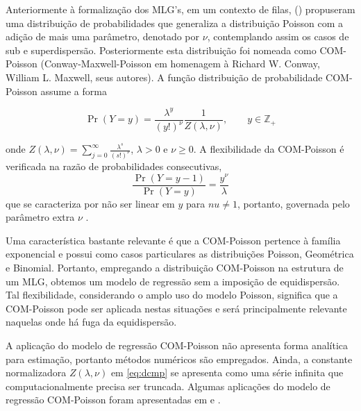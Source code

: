 \documentclass[
12pt,				%
openright,			%
oneside,			%
a4paper,			%
english,			%
brazil,				%
]{abntex2}
\begin{document}
Anteriormente à formalização dos MLG's, em um contexto de filas,
 (\citeyear{Conway1962}) propuseram uma
distribuição de probabilidades que 
generaliza a distribuição Poisson com a adição de mais uma parâmetro,
denotado por $\nu$, contemplando assim os casos de sub e
superdispersão. Posteriormente esta distribuição foi nomeada como 
COM-Poisson (Conway-Maxwell-Poisson em homenagem à Richard W. Conway,
William L. Maxwell, seus autores). A função distribuição de
probabilidade COM-Poisson assume a forma

\begin{equation} \label{eq:dcmp}
  \Pr(Y = y) = \frac{\lambda^y}{(y!)^\nu} \frac{1}{Z(\lambda, \nu)},
  \qquad y \in \mathbb{Z}_+
\end{equation}

\noindent
onde $Z(\lambda, \nu) = \sum_{j=0}^\infty \frac{\lambda^s}{(s!)^\nu}$,
$\lambda > 0$ e $\nu \geq 0$. A flexibilidade da COM-Poisson é
verificada na razão de probabilidades consecutivas,
\begin{equation}
\frac{\Pr(Y = y - 1)}{\Pr(Y = y)} = \frac{y^\nu}{\lambda}
\end{equation}
que se caracteriza por
não ser linear em $y$ para $nu \neq 1$, portanto, governada pelo
parâmetro extra $\nu$ 
\cite{Shmueli2005}.

Uma característica bastante relevante é que a COM-Poisson
pertence à família exponencial e possui como casos particulares as
distribuições Poisson, Geométrica e Binomial. Portanto, empregando a
distribuição COM-Poisson na estrutura de um MLG, obtemos um modelo de
regressão sem a imposição de equidispersão. Tal flexibilidade,
considerando o amplo uso do modelo Poisson, significa que a COM-Poisson
pode ser aplicada nestas situações e será principalmente relevante
naquelas onde há fuga da equidispersão.

A aplicação do modelo de regressão COM-Poisson não apresenta forma
analítica para estimação, portanto métodos numéricos são empregados.
Ainda, a constante normalizadora $Z(\lambda, \nu)$ em
\ref{eq:dcmp} se apresenta como uma série infinita que
computacionalmente precisa ser truncada. Algumas aplicações do modelo
de regressão COM-Poisson foram apresentadas em 
e .
\end{document}
